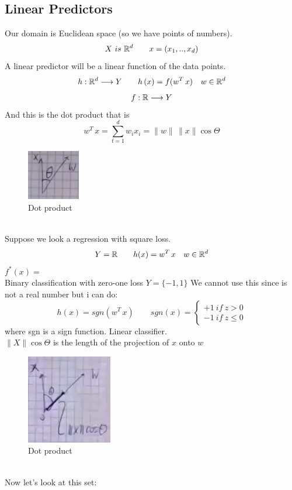 \documentclass[../main.tex]{subfiles}
\begin{document}
\subsection{Linear Predictors}
Our domain is Euclidean space (so we have points of numbers).
\\
$$
X \ is \ \mathbb{R}^d \qquad x = (x_1,..,x_d)
$$
A linear predictor will be a linear function of the data points.
$$
h: \mathbb{R}^d \longrightarrow Y \qquad h\left(x\right) = f(w^T \, x) \quad w \in \mathbb{R}^d
$$
$$
f: \mathbb{R} \longrightarrow Y
$$
And this is the dot product that is
$$
w^T \, x = \sum_{t = 1}^{d} w_i x_i = \| w \| \, \| x \| \cos \Theta
$$
\begin{figure}[h]
    \centering
    \includegraphics[width=0.2\linewidth]{../img/lez12-img2.JPG}
    \caption{Dot product}
\end{figure}\\
Suppose we look a regression with square loss.\\
$$ Y = \mathbb{R} \qquad h(x) = w^T\, x \quad w \in \mathbb{R}^d
$$
$
f^*(x) = $
\\
Binary classification with zero-one loss 
$ Y = \{ -1,1\}$
We cannot use this since is not a real number but i can do:
$$
h(x) = sgn\left(w^T\, x\right) \qquad sgn(x) = \begin{cases}
+1 \ if \ z > 0\\
-1 \ if \ z \leq 0 
\end{cases}
$$
where sgn is a sign function.
Linear classifier.
\\
$\| X \| \cos \Theta $ is the length of the projection of $x$ onto $w$
\begin{figure}[h]
    \centering
    \includegraphics[width=0.2\linewidth]{../img/lez12-img3.JPG}
    \caption{Dot product}
\end{figure}\\
Now let's look at this set:
\end{document}
